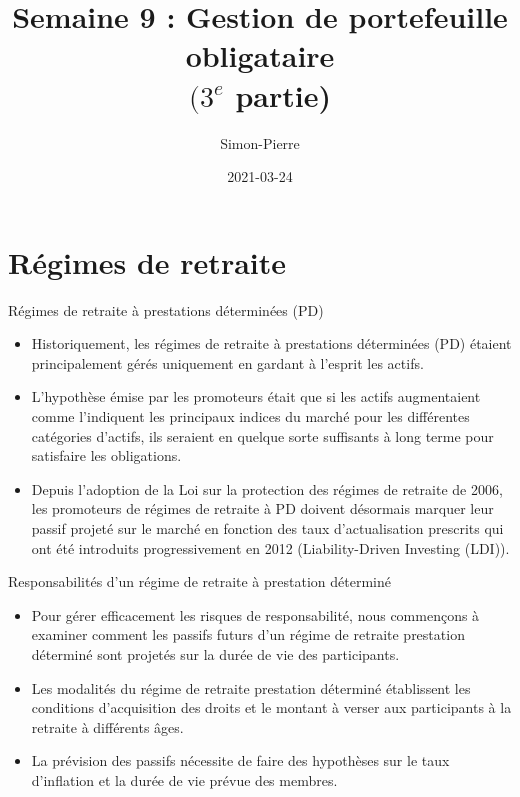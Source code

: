 \documentclass[10pt,a4paper]{beamer}
\title{Semaine 9 : Gestion de portefeuille obligataire \\ $(3^{e}$ partie)}
\date{2021-03-24}
\author{Simon-Pierre}
\institute{Université Laval}
\begin{document}
\begin{frame}
\titlepage
\end{frame}

\begin{frame}
\tableofcontents
\end{frame}

\section{Régimes de retraite}

\begin{frame}{Régimes de retraite à prestations déterminées (PD)}
\begin{itemize}[label=\bullet]
\item Historiquement, les régimes de retraite à prestations déterminées (PD) étaient principalement gérés uniquement en gardant à l'esprit les actifs.
\item L'hypothèse émise par les promoteurs était que si les actifs augmentaient comme l'indiquent les principaux indices du marché pour les différentes catégories d'actifs, ils seraient en quelque sorte suffisants à long terme pour satisfaire les obligations.
\item Depuis l'adoption de la Loi sur la protection des régimes de retraite de 2006, les promoteurs de régimes de retraite à PD doivent désormais marquer leur passif projeté sur le marché en fonction des taux d'actualisation prescrits qui ont été introduits progressivement en 2012 (Liability-Driven Investing (LDI)).
\end{itemize}
\end{frame}

\begin{frame}{Responsabilités d’un régime de retraite à prestation déterminé}
\begin{itemize}[label=\bullet]
\item Pour gérer efficacement les risques de responsabilité, nous commençons à examiner comment les passifs futurs d’un régime de retraite prestation déterminé sont projetés sur la durée de vie des participants.
\item Les modalités du régime de retraite prestation déterminé  établissent les conditions d'acquisition des droits et le montant à verser aux participants à la retraite à différents âges.
\item La prévision des passifs nécessite de faire des hypothèses sur le taux d'inflation et la durée de vie prévue des membres.
\end{itemize}
\end{frame}
\end{document}
